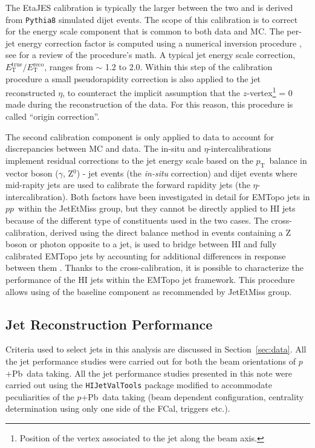 \documentclass[NOTE, atlasdraft=true, texlive=2020, UKenglish]{atlasdoc}
\newcommand{\PT}{$p_{\text{T}}$}
\newcommand{\ETA}{$\eta$}
\newcommand{\pxp}{$pp$}
\newcommand{\pxPb}{$p$+Pb}
\newcommand{\TN}[1]{ \text{#1} }
\begin{document}
The EtaJES calibration is typically the larger between the two and is derived from \texttt{Pythia8} simulated dijet events. The scope of this calibration is to correct for the energy scale component that is common to both data and MC. The per-jet energy correction factor is computed using a numerical inversion procedure \cite{Kosek:1742072, Ouellette:2655891}, see \cite{Cukierman:2016dkb} for a review of the procedure's math. A typical jet energy scale correction, $E_{\TN{T}}^{\TN{true}}/E_{\TN{T}}^{\TN{reco}}$, ranges from $\sim$ 1.2 to 2.0. Within this step of the calibration procedure a small pseudorapidity correction is also applied to the jet reconstructed \ETA, to counteract the implicit assumption that the $z$-vertex\footnote{Position of the vertex associated to the jet along the beam axis.} = 0 made during the reconstruction of the data. For this reason, this procedure is called ``origin correction''.

The second calibration component is only applied to data to account for discrepancies between MC and data. The in-situ and \ETA-intercalibrations implement residual corrections to the jet energy scale based on the \PT\ balance in vector boson ($\gamma$, Z$^0$) - jet events (the \textit{in-situ} correction) and dijet events where mid-rapity jets are used to calibrate the forward rapidity jets (the \ETA-intercalibration).
Both factors have been investigated in detail for EMTopo jets in \pxp\ within the JetEtMiss group, but they cannot be directly applied to HI jets because of the different type of constituents used in the two cases.  The cross-calibration, derived using the direct balance method in events containing a Z boson or photon opposite to a jet, is used to bridge between HI and fully calibrated EMTopo jets by accounting for additional differences in response between them \cite{Ouellette:2655891}. Thanks to the cross-calibration, it is possible to characterize the performance of the HI jets within the EMTopo jet framework. This procedure allows using of the baseline component as recommended by JetEtMiss group. 



\subsection{Jet Reconstruction Performance}
Criteria used to select jets in this analysis are discussed in Section~\ref{sec:data}. All the jet performance studies were carried out for both the beam orientations of \pxPb\ data taking.
All the jet performance studies presented in this note were carried out using the \texttt{HIJetValTools} package \cite{2022:HIJetValTools} modified to accommodate peculiarities of the \pxPb\ data taking \cite{2022:HIJetValTools-pPb} (beam dependent configuration, centrality determination using only one side of the FCal, triggers etc.). 
\end{document}
